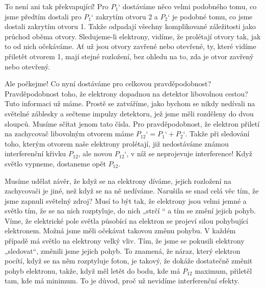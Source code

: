     To není ani tak překvapující! Pro \(P_1‘\) dostáváme něco velmi podobného tomu, co jsme předtím
    dostali pro \(P_1‘\) zakrytím otvoru 2 a \(P_2‘\) je podobné tomu, co jsme dostali zakrytím
    otvoru 1. Takže odpadají všechny komplikované záležitosti jako průchod oběma otvory.
    Sledujeme-li elektrony, vidíme, že prolétají otvory tak, jak to od nich očekáváme. Ať už jsou
    otvory zavřené nebo otevřené, ty, které vidíme přiletět otvorem 1, mají stejné rozložení, bez
    ohledu na to, zda je otvor zavřený nebo otevřený.
    
    Ale počkejme! Co nyní dostáváme pro celkovou pravděpodobnost? Pravděpodobnost toho, že elektrony
    dopadnou na detektor libovolnou cestou? Tuto informaci už máme. Prostě se zatváříme, jako bychom
    se nikdy nedívali na světelné záblesky a sečteme impulzy detektoru, jež jsme měli rozděleny do
    dvou sloupců. Musíme sčítat jenom tato čísla. Pro pravděpodobnost, že elektron přiletí na
    zachycovač libovolným otvorem máme \(P_{12}‘ = P_1‘ + P_2‘\). Takže při sledování toho, kterým
    otvorem naše elektrony prolétají, již nedostáváme známou interferenční křivku \(P_{12}\), ale
    novou \(P_{12}‘\), v níž se neprojevuje interference! Když světlo vypneme, dostaneme opět
    \(P_{12}\).

    Musíme udělat závěr, že když se na elektrony díváme, jejich rozložení na zachycovači je jiné,
    než když se na ně nedíváme. Narušila se snad celá věc tím, že jsme zapnuli světelný zdroj? Musí
    to být tak, že elektrony jsou velmi jemné a světlo tím, že se na nich rozptyluje, do nich „strčí
    “ a tím se změní jejich pohyb. Víme, že elektrické pole světla působící na elektron se projeví
    silou pohybující elektronem. Možná jsme měli očekávat takovou změnu pohybu. V každém případě má
    světlo na elektrony velký vliv. Tím, že jsme se pokusili elektrony „sledovat“, změnili jsme
    jejich pohyb. To znamená, že náraz, který elektron pocítí, když se na něm rozptyluje foton, je
    takový, že dokáže dostatečně změnit pohyb elektronu, takže, když měl letět do bodu, kde má
    \(P_{12}\) maximum, přiletěl tam, kde má minimum. To je důvod, proč už nevidíme interferenční
    efekty.
    
